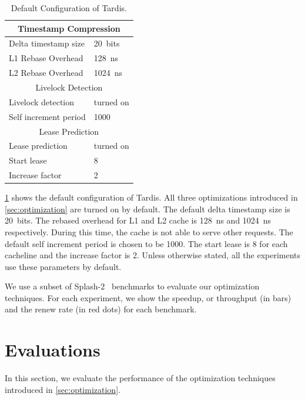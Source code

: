 \documentclass[12pt]{article}
\begin{document}
\begin{table}
	\caption{ Default Configuration of Tardis. }
	\begin{center}
	{ 
		\begin{tabular}{|l|l|}
            \hline
			\multicolumn{2}{|c|}{Timestamp Compression} \\
			\hline
			Delta timestamp size 		& 20~bits \\
			L1 Rebase Overhead 			& 128~ns\\
			L2 Rebase Overhead			& 1024~ns \\
			\hline
			\multicolumn{2}{|c|}{Livelock Detection} \\
			\hline
			Livelock detection 			& turned on \\
			Self increment period 		& 1000 \\
			\hline
			\multicolumn{2}{|c|}{Lease Prediction} \\
			\hline
			Lease prediction			& turned on \\
			Start lease 				& 8 \\
			Increase factor				& 2 \\
			\hline
		\end{tabular}
    }
	\end{center}
    \label{tab:system}
	\vspace{-.2in}
\end{table}

\cref{tab:system} shows the default configuration of Tardis. All 
three optimizations introduced in \cref{sec:optimization} are turned 
on by default. The default delta timestamp size is 20~bits. The
rebased overhead for L1 and L2 cache is 128~ns and 1024~ns 
respectively. During this time, the cache is not able to serve other 
requests. The default self increment period is chosen to be 1000. The 
start lease is 8 for each cacheline and the increase factor is 2. 
Unless otherwise stated, all the experiments use these parameters by 
default.

We use a subset of Splash-2~\cite{splash2} benchmarks to evaluate our 
optimization techniques. For each experiment, we show the speedup, or 
throughput (in bars) and the renew rate (in red dots) for each 
benchmark.

\section{Evaluations}

In this section, we evaluate the performance of the optimization 
techniques introduced in \cref{sec:optimization}.
\end{document}
